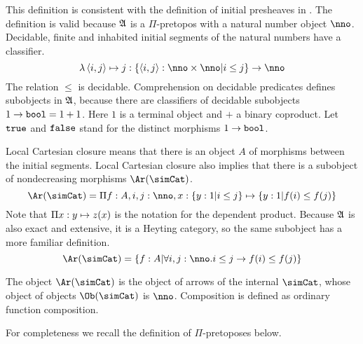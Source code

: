 \documentclass[csh.tex]{subfiles}
\begin{document}
This definition is consistent with the definition of initial presheaves in \citep{MR1300636}. The definition is valid because $\mathfrak A$ is a $\Pi$-pretopos with a natural number object $\nno$. Decidable, finite and inhabited initial segments of the natural numbers have a classifier.
\[  \function{\tuplet{i,j}}j\of\set{\tuplet{i,j}\of\nno\times\nno\middle|i\leq j}\to \nno \]
The relation $\leq$ is decidable. Comprehension on decidable predicates defines subobjects in $\mathfrak A$, because there are classifiers of decidable subobjects $1\to \mathtt{bool} = 1+1$. Here $1$ is a terminal object and $+$ a binary coproduct. Let $\mathtt{true}$ and $\mathtt{false}$ stand for the distinct morphisms $1\to\mathtt{bool}$.

Local Cartesian closure means that there is an object $A$ of morphisms between the initial segments. Local Cartesian closure also implies that there is a subobject of nondecreasing morphisms $\Ar(\simCat)$.
\[ \Ar(\simCat)=\product{f\of A,i,j\of\nno,x\of\set{y\of 1|i\leq j}}{\set{y\of 1|f(i)\leq f(j)}}\]
Note that $\Pi x: y \mapsto z(x)$ is the notation for the dependent product. 
Because $\mathfrak A$ is also exact and extensive, it is a Heyting category, so the same subobject has a more familiar definition.
\[ \Ar(\simCat)=\set{f\of A|\forall i,j\of\nno.i\leq j \to f(i)\leq f(j)} \]

\begin{definition} The object $\Ar(\simCat)$ is the object of arrows of the internal  $\simCat$, whose object of objects $\Ob(\simCat)$ is $\nno$. Composition is defined as ordinary function composition.
\end{definition}

For completeness we recall the definition of $\Pi$-pretoposes below.
\end{document}

